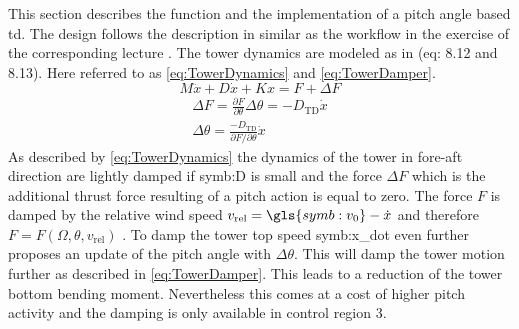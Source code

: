 This section describes the function and the implementation of a pitch angle based \gls{td}. 
The design follows the description in \cite{WindEnergyHandbook} similar as the workflow in the exercise of the corresponding lecture \cite{SchlipfLecture}. 
The tower dynamics are modeled as in \cite{WindEnergyHandbook} (eq: 8.12 and 8.13). 
Here referred to as \ref{eq:TowerDynamics} and \ref{eq:TowerDamper}.
\begin{equation}
	M\ddot{x} + D\dot{x} + Kx = F + \Delta F
	\label{eq:TowerDynamics}
\end{equation}
\begin{equation}
	\begin{aligned}
		\Delta F = \frac{\partial F}{\partial \theta}\Delta\theta = -D_{\text{TD}}\dot{x}\\
		\Delta\theta = \frac{-D_{\text{TD}}}{\partial F/\partial \theta}\dot{x}
	\end{aligned}
	\label{eq:TowerDamper}
\end{equation}
As described by \ref{eq:TowerDynamics} the dynamics of the tower in fore-aft direction are lightly damped if \gls{symb:D} is small and the force $\Delta F$ which is the additional thrust force resulting of a pitch action is equal to zero. The force $F$ is damped by the relative wind speed $v_{\text{rel}} = \gls{symb:v_0} - \dot{x}$ and therefore $F = F(\Omega, \theta, v_{\text{rel}})$ \cite{SchlipfLecture}. To damp the tower top speed \gls{symb:x_dot} even further \cite{WindEnergyHandbook} proposes an update of the pitch angle with $\Delta\theta$. This will damp the tower motion further as described in \ref{eq:TowerDamper}. This leads to a reduction of the tower bottom bending moment. Nevertheless this comes at a cost of higher pitch activity and the damping is only available in control region 3. 

